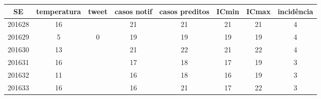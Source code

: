 \begin{tabular}{c|ccccccc}
  \hline
SE & temperatura & tweet & casos notif & casos preditos & ICmin & ICmax & incidência \\ 
  \hline
201628 & 16 &  & 21 & 21 & 21 & 21 & 4 \\ 
  201629 & 5 & 0 & 19 & 19 & 19 & 19 & 4 \\ 
  201630 & 13 &  & 21 & 22 & 21 & 22 & 4 \\ 
  201631 & 16 &  & 17 & 18 & 17 & 19 & 3 \\ 
  201632 & 11 &  & 16 & 18 & 16 & 19 & 3 \\ 
  201633 & 16 &  & 16 & 21 & 17 & 22 & 3 \\ 
   \hline
\end{tabular}
